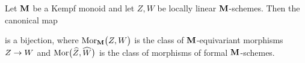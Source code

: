 \begin{corollary}\label{corollary:morphisms_of_locally_linear_schemes_are_morphisms_of_formal_neighborhoods}
Let $\mathbf{M}$ be a Kempf monoid and let $Z,W$ be locally linear $\mathbf{M}$-schemes. Then the canonical map
\begin{center}
\end{center}
is a bijection, where $\mathrm{Mor}_{\mathbf{M}}\big(Z,W\big)$ is the class of $\mathbf{M}$-equivariant morphisms $Z\rightarrow W$ and $\mathrm{Mor}\big(\widehat{Z},\widehat{W}\big)$ is the class of morphisms of formal $\mathbf{M}$-schemes.
\end{corollary}
